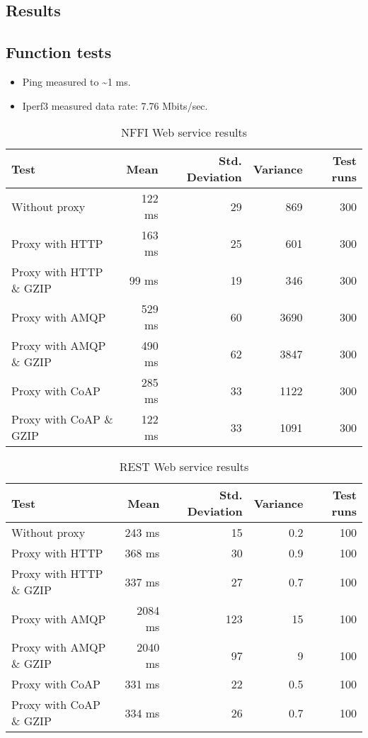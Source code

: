 \begin{appendices}
\chapter{Results}

\section{Function tests}

\begin{itemize}
	\item Ping measured to \textasciitilde 1 ms.
	\item Iperf3 measured data rate: 7.76 Mbits/sec.
\end{itemize}

\begin{table}[H]
\begin{tabular}{| l | r | r | r | r |}
\hline
  \textbf{Test} & \textbf{Mean} & \textbf{Std. Deviation} & \textbf{Variance} & \textbf{Test runs}\\ \hline
  Without proxy & 122 ms & 29 & 869 & 300 \\ \hline
  Proxy with HTTP & 163 ms & 25 & 601 & 300 \\ \hline
  Proxy with HTTP \& GZIP & 99 ms & 19 & 346 & 300 \\ \hline
  Proxy with AMQP & 529 ms & 60 & 3690 & 300 \\ \hline
  Proxy with AMQP \& GZIP & 490 ms & 62 & 3847 & 300\\ \hline
  Proxy with CoAP & 285 ms & 33 & 1122 & 300 \\ \hline
  Proxy with CoAP \& GZIP & 122 ms & 33 & 1091 & 300 \\ \hline
\end{tabular}
\caption{NFFI Web service results}
\end{table}


\begin{table}[H]
\begin{tabular}{| l | r | r | r | r |}
\hline
  \textbf{Test} & \textbf{Mean} & \textbf{Std. Deviation} & \textbf{Variance} & \textbf{Test runs}\\ \hline
  Without proxy & 243 ms & 15 & 0.2 & 100 \\ \hline
  Proxy with HTTP & 368 ms & 30 & 0.9 & 100 \\ \hline
  Proxy with HTTP \& GZIP & 337 ms & 27 & 0.7 & 100 \\ \hline
  Proxy with AMQP & 2084 ms & 123 & 15 & 100 \\ \hline
  Proxy with AMQP \& GZIP & 2040 ms & 97 & 9 & 100\\ \hline
  Proxy with CoAP & 331 ms & 22 & 0.5 & 100 \\ \hline
  Proxy with CoAP \& GZIP & 334 ms & 26 & 0.7 & 100 \\ \hline
\end{tabular}
\caption{REST Web service results}
\end{table}



\end{appendices}
